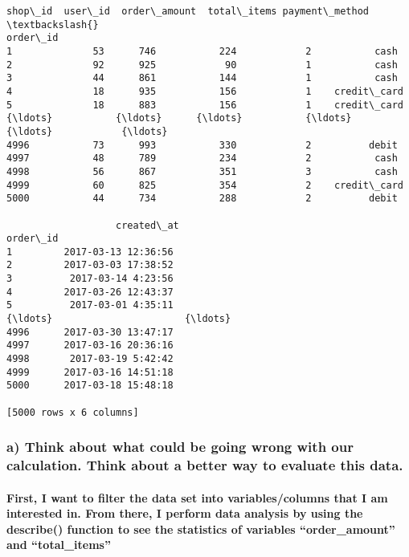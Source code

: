 \documentclass[11pt]{article}
\makeatletter
\newcommand{\boxspacing}{\kern\kvtcb@left@rule\kern\kvtcb@boxsep}
\newcommand{\prompt}[4]{
        {\ttfamily\llap{{\color{#2}[#3]:\hspace{3pt}#4}}\vspace{-\baselineskip}}
    }
\makeatother
\begin{document}
            \begin{tcolorbox}[breakable, size=fbox, boxrule=.5pt, pad at break*=1mm, opacityfill=0]
\prompt{Out}{outcolor}{2}{\boxspacing}
\begin{Verbatim}[commandchars=\\\{\}]
          shop\_id  user\_id  order\_amount  total\_items payment\_method  \textbackslash{}
order\_id
1              53      746           224            2           cash
2              92      925            90            1           cash
3              44      861           144            1           cash
4              18      935           156            1    credit\_card
5              18      883           156            1    credit\_card
{\ldots}           {\ldots}      {\ldots}           {\ldots}          {\ldots}            {\ldots}
4996           73      993           330            2          debit
4997           48      789           234            2           cash
4998           56      867           351            3           cash
4999           60      825           354            2    credit\_card
5000           44      734           288            2          debit

                   created\_at
order\_id
1         2017-03-13 12:36:56
2         2017-03-03 17:38:52
3          2017-03-14 4:23:56
4         2017-03-26 12:43:37
5          2017-03-01 4:35:11
{\ldots}                       {\ldots}
4996      2017-03-30 13:47:17
4997      2017-03-16 20:36:16
4998       2017-03-19 5:42:42
4999      2017-03-16 14:51:18
5000      2017-03-18 15:48:18

[5000 rows x 6 columns]
\end{Verbatim}
\end{tcolorbox}
        
    \hypertarget{a-think-about-what-could-be-going-wrong-with-our-calculation.-think-about-a-better-way-to-evaluate-this-data.}{%
\subsubsection{a) Think about what could be going wrong with our
calculation. Think about a better way to evaluate this
data.}\label{a-think-about-what-could-be-going-wrong-with-our-calculation.-think-about-a-better-way-to-evaluate-this-data.}}

    \hypertarget{first-i-want-to-filter-the-data-set-into-variablescolumns-that-i-am-interested-in.-from-there-i-perform-data-analysis-by-using-the-describe-function-to-see-the-statistics-of-variables-order_amount-and-total_items}{%
\paragraph{First, I want to filter the data set into variables/columns
that I am interested in. From there, I perform data analysis by using
the describe() function to see the statistics of variables
``order\_amount'' and
``total\_items''}\label{first-i-want-to-filter-the-data-set-into-variablescolumns-that-i-am-interested-in.-from-there-i-perform-data-analysis-by-using-the-describe-function-to-see-the-statistics-of-variables-order_amount-and-total_items}}
\end{document}
